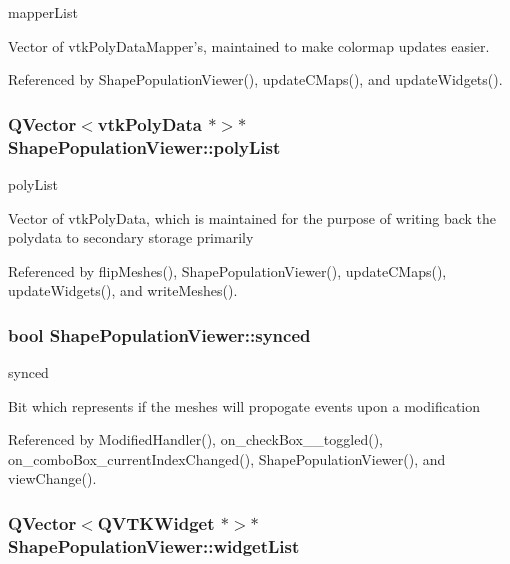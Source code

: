mapper\-List 

Vector of vtk\-Poly\-Data\-Mapper's, maintained to make colormap updates easier. 

Referenced by Shape\-Population\-Viewer(), update\-C\-Maps(), and update\-Widgets().

\hypertarget{class_shape_population_viewer_a5533e0d642467a70e349fa79a24bfc51}{
\subsubsection[{poly\-List}]{\setlength{\rightskip}{0pt plus 5cm}Q\-Vector$<$vtk\-Poly\-Data $\ast$$>$$\ast$ Shape\-Population\-Viewer\-::poly\-List\hspace{0.3cm}{\ttfamily [protected]}}}\label{class_shape_population_viewer_a5533e0d642467a70e349fa79a24bfc51}


poly\-List 

Vector of vtk\-Poly\-Data, which is maintained for the purpose of writing back the polydata to secondary storage primarily 

Referenced by flip\-Meshes(), Shape\-Population\-Viewer(), update\-C\-Maps(), update\-Widgets(), and write\-Meshes().

\hypertarget{class_shape_population_viewer_a42b6a8e7a7b2c90615e73c80988f547d}{
\subsubsection[{synced}]{\setlength{\rightskip}{0pt plus 5cm}bool Shape\-Population\-Viewer\-::synced\hspace{0.3cm}{\ttfamily [protected]}}}\label{class_shape_population_viewer_a42b6a8e7a7b2c90615e73c80988f547d}


synced 

Bit which represents if the meshes will propogate events upon a modification 

Referenced by Modified\-Handler(), on\-\_\-check\-Box\-\_\-\_\-toggled(), on\-\_\-combo\-Box\-\_\-current\-Index\-Changed(), Shape\-Population\-Viewer(), and view\-Change().

\hypertarget{class_shape_population_viewer_adaf84d2191b3d5452455bf43864ad2f2}{
\subsubsection[{widget\-List}]{\setlength{\rightskip}{0pt plus 5cm}Q\-Vector$<$Q\-V\-T\-K\-Widget $\ast$$>$$\ast$ Shape\-Population\-Viewer\-::widget\-List\hspace{0.3cm}{\ttfamily [protected]}}}\label{class_shape_population_viewer_adaf84d2191b3d5452455bf43864ad2f2}


